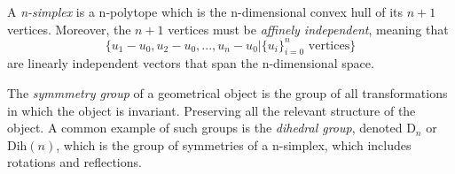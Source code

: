 \documentclass{article}
\begin{document}
      \begin{definition}
        A \textit{n-simplex} is a n-polytope which is the n-dimensional convex hull of its $n+1$ vertices. Moreover, the $n+1$ vertices must be \textit{affinely independent}, meaning that
        \begin{equation}
          \{u_1 - u_0, u_2 - u_0, ..., u_n - u_0 | \{u_i\}_{i=0}^{n} \text{ vertices} \}
        \end{equation}
        are linearly independent vectors that span the n-dimensional space. 
      \end{definition}

      \begin{definition}
        The \textit{symmmetry group} of a geometrical object is the group of all transformations in which the object is invariant. Preserving all the relevant structure of the object. A common example of such groups is the \textit{dihedral group}, denoted D$_{n}$ or Dih$(n)$, which is the group of symmetries of a n-simplex, which includes rotations and reflections. 
      \end{definition}
\end{document}
